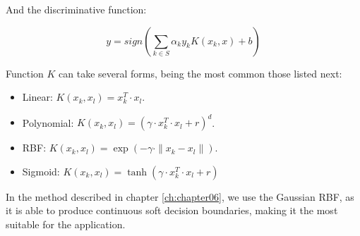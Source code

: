 And the discriminative function:

\begin{equation}\label{eq:appendixSVM_soft_discriminative_function}
 y = sign \left( \sum_{k \in S} \alpha_k y_k K(x_k, x) + b \right)
\end{equation}

Function $K$ can take several forms, being the most common those listed next:
\begin{itemize}
 \item Linear: $K(x_k, x_l) = x_k^T \cdot x_l$.
 \item Polynomial: $K(x_k, x_l) = (\gamma \cdot x_k^T \cdot x_l + r)^d$.
 \item \acf{RBF}: $K(x_k, x_l) = \exp(-\gamma \cdot \| x_k - x_l\|)$.
 \item Sigmoid: $K(x_k, x_l) = \tanh(\gamma \cdot x_k^T \cdot x_l + r)$
\end{itemize}

In the method described in chapter \ref{ch:chapter06}, we use the Gaussian \acf{RBF}, as it is able to produce continuous soft decision boundaries, making it the most suitable for the application.